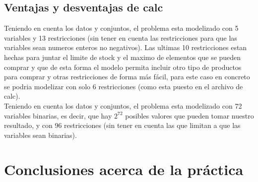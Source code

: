 \documentclass[11pt,spanish]{article}
\begin{document}
		\subsection{Ventajas y desventajas de calc}
		Teniendo en cuenta los datos y conjuntos, el problema esta modelizado con 5 variables y 13 restricciones (sin tener en cuenta las restricciones para que las variables sean numeros enteros no negativos). Las ultimas 10 restricciones estan hechas para juntar el limite de stock y el maximo de elementos que se pueden comprar y que de esta forma el modelo permita incluir otro tipo de productos para comprar y otras restricciones de forma más fácil, para este caso en concreto se podria modelizar con solo 6 restricciones (como esta puesto en el archivo de calc).\\
		Teniendo en cuenta los datos y conjuntos, el problema esta modelizado con 72 variables binarias, es decir, que hay $2^{72}$ posibles valores que pueden tomar nuestro resultado, y con 96 restricciones (sin tener en cuenta las que limitan a que las variables sean binarias).
	\section{Conclusiones acerca de la práctica}
	\newpage
\end{document}
